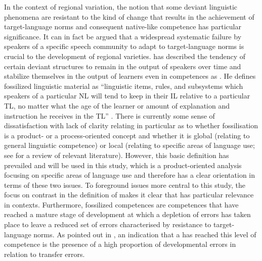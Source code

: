 \documentclass[output=paper]{langsci/langscibook}
\begin{document}
In the context of regional variation, the notion that some deviant
linguistic phenomena are resistant to the kind of change that results
in the achievement of target-language norms and consequent native-like
competence has particular significance. It can in fact be argued that
a widespread systematic failure by speakers of a specific speech
community to adapt to target-language norms is crucial to the
development of regional varieties. \citet{Selinker1974} has described
the tendency of certain deviant structures to remain in the output of
speakers over time and stabilize themselves in the output of learners
even in  competences as . He defines
fossilized linguistic material as “linguistic items, rules, and
subsystems which speakers of a particular NL will tend to keep in
their IL relative to a particular TL, no matter what the age of the
learner or amount of explanation and instruction he receives in the
TL” \citep[36]{Selinker1974}. There is currently some sense of
dissatisfaction with lack of clarity relating in particular as to
whether fossilisation is a product- or a process-oriented concept and
whether it is global (relating to general linguistic competence) or
local (relating to specific areas of language use; see
\citealt{Fidler2006} for a review of relevant literature). However,
this basic definition has prevailed and will be used in this study,
which is a product-oriented analysis focusing on specific areas of
language use and therefore has a clear orientation in terms of these
two issues.  To foreground issues more central to this study, the
focus on contrast in the definition of \citet{Selinker1974}
makes it clear that
 has particular relevance in 
contexts. Furthermore, fossilized competences are competences that
have reached a mature stage of development at which a depletion of
errors has taken place to leave a reduced set of errors characterised
by resistance to target-language norms. As pointed out in
, an indication that a  has reached this
level of competence is the presence of a high proportion of
developmental errors in relation to transfer errors.
\end{document}
